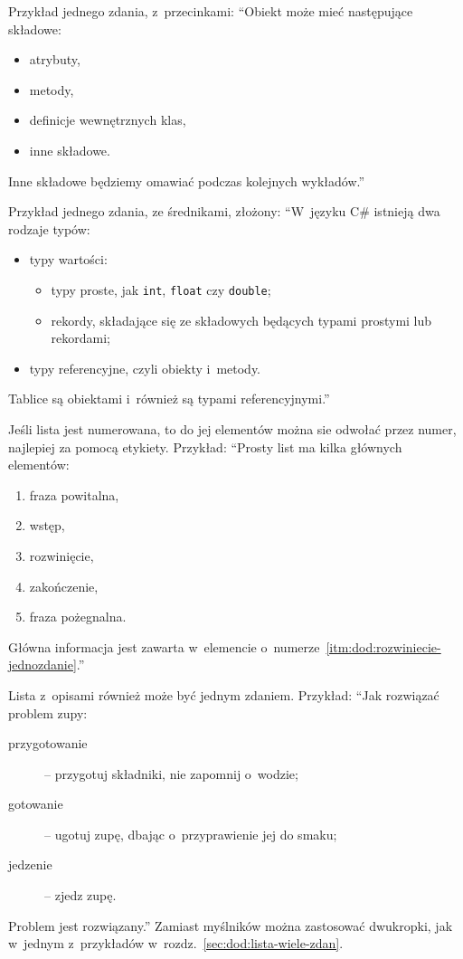 Przykład jednego zdania, z~przecinkami:
``Obiekt może mieć następujące składowe:
\begin{itemize}
  \item atrybuty,
  \item metody,
  \item definicje wewnętrznych klas,
  \item inne składowe.
\end{itemize}
Inne składowe będziemy omawiać podczas kolejnych wykładów.''

Przykład jednego zdania, ze średnikami, złożony:
``W~języku C\# istnieją dwa rodzaje typów:
\begin{itemize}
  \item typy wartości:
  \begin{itemize}
    \item typy proste, jak {\tt int}, {\tt float} czy {\tt double};
    \item rekordy, składające się ze składowych będących typami prostymi lub rekordami;
  \end{itemize}
  \item typy referencyjne, czyli obiekty i~metody.
\end{itemize}
Tablice są obiektami i~również są typami referencyjnymi.''

Jeśli lista jest numerowana, to do jej elementów można sie odwołać przez numer, najlepiej za pomocą etykiety. Przykład:
``Prosty list ma kilka głównych elementów:\linebreak[2]
\begin{enumerate}
  \item fraza powitalna,
  \item wstęp,
  \item rozwinięcie, \label{itm:dod:rozwiniecie-jednozdanie}
  \item zakończenie,
  \item fraza pożegnalna.
\end{enumerate}
Główna informacja jest zawarta w~elemencie o~numerze~\ref{itm:dod:rozwiniecie-jednozdanie}.''

Lista z~opisami również może być jednym zdaniem. Przykład: ``Jak rozwiązać problem zupy:
\begin{description}
  \item[przygotowanie] -- przygotuj składniki, nie zapomnij o~wodzie;
  \item[gotowanie] -- ugotuj zupę, dbając o~przyprawienie jej do smaku;
  \item[jedzenie] -- zjedz zupę.
\end{description}
Problem jest rozwiązany.''
Zamiast myślników można zastosować dwukropki, jak w~jednym z~przykładów w~rozdz.~\ref{sec:dod:lista-wiele-zdan}.


